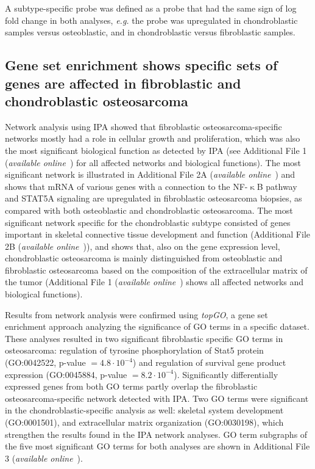 %
%
%
%
A subtype\hyp{}specific
probe was defined as a probe that had the same
sign of log fold change in both analyses, {\it e.g.} the probe
was upregulated in chondroblastic samples versus osteoblastic,
and in chondroblastic versus fibroblastic
samples.

\subsection{Gene set enrichment shows specific sets of genes are affected in fibroblastic and chondroblastic osteosarcoma}
Network analysis using IPA showed that fibroblastic
osteosarcoma\hyp{}specific networks most\-ly had a role in cellular
growth and proliferation, which was also the most
significant biological function as detected by IPA (see
Additional File 1 ({\it available online}~\cite{ch3additional}) for all affected networks and biological
functions). The most significant network is illustrated in
Additional File 2A ({\it available online}~\cite{ch3additional}) and shows that mRNA of various
genes with a connection to the NF-$\upkappa$B pathway and
STAT5A signaling are upregulated in fibroblastic osteosarcoma
biopsies, as compared with both osteoblastic
and chondroblastic osteosarcoma. The most significant
network specific for the chondroblastic subtype consisted
of genes important in skeletal connective tissue
development and function (Additional File 2B ({\it available online}~\cite{ch3additional})), and
shows that, also on the gene expression level, chondroblastic
osteosarcoma is mainly distinguished from osteoblastic
and fibroblastic osteosarcoma based on the
composition of the extracellular matrix of the tumor
(Additional File 1 ({\it available online}~\cite{ch3additional}) shows all affected networks and biological
functions).

Results from network analysis were confirmed using
{\it topGO}, a gene set enrichment approach analyzing the significance
of GO terms in a specific dataset. These analyses
resulted in two significant fibroblastic specific GO terms
in osteosarcoma: regulation of tyrosine phosphorylation of
Stat5 protein (GO:0042522, p-value $=4.8\cdot10^{-4}$) and regulation of
survival gene product expression (GO:0045884, p-value $=8.2\cdot10^{-
4}$). Significantly differentially expressed genes from both
GO terms partly overlap the fibroblastic osteosarcoma\hyp{}specific
network detected with IPA. Two GO terms were
significant in the chondroblastic\hyp{}specific analysis as well:
skeletal system development (GO:0001501), and extracellular
matrix organization (GO:0030198), which strengthen
the results found in the IPA network analyses. GO term
subgraphs of the five most significant GO terms for both
analyses are shown in Additional File 3 ({\it available online}~\cite{ch3additional}).

